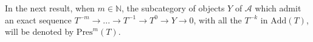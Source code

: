 \documentclass{proc-l}
\newcommand{\Ext}{{\rm Ext}}
\newtheorem{theorem}{Theorem}[section]
\theoremstyle{definition}
\theoremstyle{remark}
\numberwithin{equation}{section}
\begin{document}
 In the next result, when $m\in\mathbb{N}$, the subcategory of objects $Y$ of $\mathcal{A}$ which admit an exact sequence $T^{-m}\longrightarrow...\longrightarrow T^{-1}\longrightarrow T^0\longrightarrow Y\rightarrow 0$, with all the $T^{-k}$ in $\text{Add}(T)$, will be denoted by $\text{Pres}^m(T)$.
\end{document}
